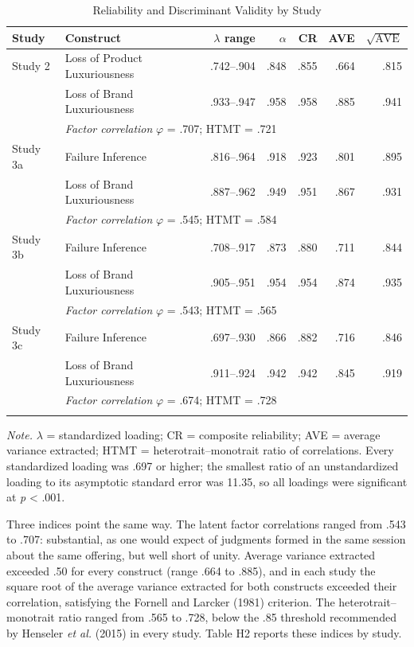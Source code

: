 \documentclass[12pt, a4paper]{article}
\begin{document}
\begin{table}[H]
\centering
\begin{singlespace}
\caption{Reliability and Discriminant Validity by Study}
\small
\begin{tabular}{@{}llrrrrr@{}}
\toprule
Study & Construct & $\lambda$ range & $\alpha$ & CR & AVE & $\sqrt{\text{AVE}}$ \\
\midrule
Study 2 & Loss of Product Luxuriousness & .742--.904 & .848 & .855 & .664 & .815 \\
 & Loss of Brand Luxuriousness & .933--.947 & .958 & .958 & .885 & .941 \\
 & \multicolumn{6}{l}{\emph{Factor correlation} $\varphi$ = .707; HTMT = .721} \\
\addlinespace
Study 3a & Failure Inference & .816--.964 & .918 & .923 & .801 & .895 \\
 & Loss of Brand Luxuriousness & .887--.962 & .949 & .951 & .867 & .931 \\
 & \multicolumn{6}{l}{\emph{Factor correlation} $\varphi$ = .545; HTMT = .584} \\
\addlinespace
Study 3b & Failure Inference & .708--.917 & .873 & .880 & .711 & .844 \\
 & Loss of Brand Luxuriousness & .905--.951 & .954 & .954 & .874 & .935 \\
 & \multicolumn{6}{l}{\emph{Factor correlation} $\varphi$ = .543; HTMT = .565} \\
\addlinespace
Study 3c & Failure Inference & .697--.930 & .866 & .882 & .716 & .846 \\
 & Loss of Brand Luxuriousness & .911--.924 & .942 & .942 & .845 & .919 \\
 & \multicolumn{6}{l}{\emph{Factor correlation} $\varphi$ = .674; HTMT = .728} \\
\addlinespace
\bottomrule
\end{tabular}
\raggedright\emph{Note.} $\lambda$ = standardized loading; CR = composite reliability; AVE = average variance extracted; HTMT = heterotrait--monotrait ratio of correlations. Every standardized loading was .697 or higher; the smallest ratio of an unstandardized loading to its asymptotic standard error was 11.35, so all loadings were significant at \emph{p} \textless{} .001.
\end{singlespace}
\end{table}

Three indices point the same way. The latent factor correlations ranged from .543 to .707: substantial, as one would expect of judgments formed in the same session about the same offering, but well short of unity. Average variance extracted exceeded .50 for every construct (range .664 to .885), and in each study the square root of the average variance extracted for both constructs exceeded their correlation, satisfying the Fornell and Larcker (1981) criterion. The heterotrait--monotrait ratio ranged from .565 to .728, below the .85 threshold recommended by Henseler \emph{et al.} (2015) in every study. Table H2 reports these indices by study.
\end{document}

